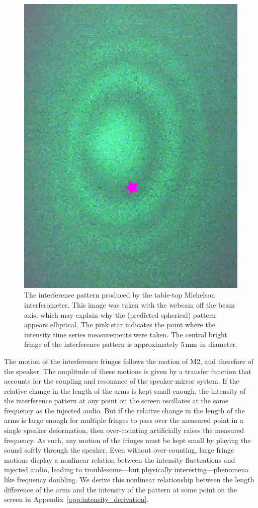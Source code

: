 \documentclass[paper-main.tex]{subfiles}
\begin{document}
\begin{figure}
 \begin{center}
  \includegraphics[height=.45\textwidth, angle=-90]{figures/webcam_still0_star.pdf}
 \end{center}
 \caption{\label{fig:interference_pattern}
The interference pattern produced by the table-top Michelson interferometer.
This image was taken with the webcam off the beam axis, which may explain why the (predicted spherical) pattern appears elliptical.
The pink star indicates the point where the intensity time series measurements were taken.
The central bright fringe of the interference pattern is approximately $5\,{\rm mm}$ in diameter. 
}
\end{figure}

The motion of the interference fringes follows the motion of M2, and therefore of the speaker.
The amplitude of these motions is given by a transfer function that accounts for the coupling and resonance of the speaker-mirror system.
If the relative change in the length of the arms is kept small enough, the intensity of the interference pattern at any point on the screen oscillates at the same frequency as the injected audio.
But if the relative change in the length of the arms is large enough for multiple fringes to pass over the measured point in a single speaker deformation, then over-counting artificially raises the measured frequency.
As such, any motion of the fringes must be kept small by playing the sound softly through the speaker.
Even without over-counting, large fringe motions display a nonlinear relation between the intensity fluctuations and injected audio, leading to troublesome---but physically interesting---phenomena like frequency doubling.
We derive this nonlinear relationship between the length difference of the arms and the intensity of the pattern at some point on the screen in Appendix~\ref{app:intensity_derivation}.


\end{document}
